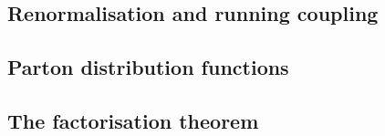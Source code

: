 
\subsection{Renormalisation and running coupling}
\subsection{Parton distribution functions}
\subsection{The factorisation theorem}
